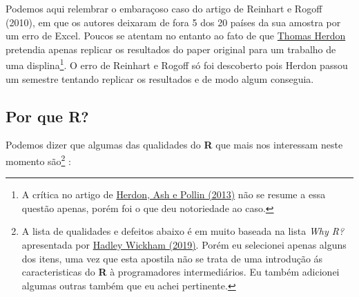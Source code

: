 \documentclass[
]{article}
\begin{document}
Podemos aqui relembrar o embaraçoso caso do artigo de Reinhart e Rogoff
(2010), em que os autores deixaram de fora 5 dos 20 países da sua
amostra por um erro de Excel. Poucos se atentam no entanto ao fato de
que \href{https://en.wikipedia.org/wiki/Thomas_Herndon}{Thomas Herdon}
pretendia apenas replicar os resultados do paper original para um
trabalho de uma displina\footnote{A crítica no artigo de
  \href{http://www.peri.umass.edu/fileadmin/pdf/working_papers/working_papers_301-350/WP322.pdf}{Herdon,
  Ash e Pollin (2013)} não se resume a essa questão apenas, porém foi o
  que deu notoriedade ao caso.}. O erro de Reinhart e Rogoff só foi
descoberto pois Herdon passou um semestre tentando replicar os
resultados e de modo algum conseguia.

\hypertarget{por-que-r}{%
\subsection{Por que R?}\label{por-que-r}}

Podemos dizer que algumas das qualidades do \textbf{R} que mais nos
interessam neste momento são\footnote{A lista de qualidades e defeitos
  abaixo é em muito baseada na lista \emph{Why R?} apresentada por
  \href{https://adv-r.hadley.nz/introduction.html}{Hadley Wickham
  (2019)}. Porém eu selecionei apenas alguns dos itens, uma vez que esta
  apostila não se trata de uma introdução ás caracteristicas do
  \textbf{R} à programadores intermediários. Eu também adicionei algumas
  outras também que eu achei pertinente.} :
\end{document}
